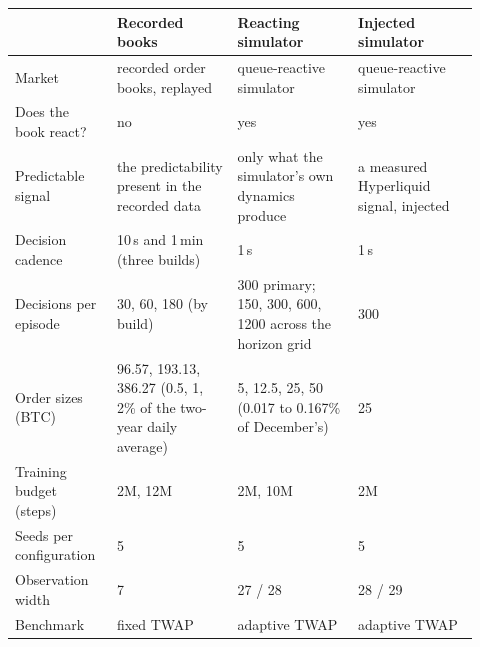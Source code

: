 \begin{tabular}{@{}>{\raggedright\arraybackslash}p{0.2\linewidth}p{0.24\linewidth}p{0.24\linewidth}p{0.24\linewidth}@{}}
\toprule
\textbf{} & \textbf{Recorded books} & \textbf{Reacting simulator} & \textbf{Injected simulator} \\
\midrule
Market & recorded order books, replayed & queue-reactive simulator & queue-reactive simulator \\
\addlinespace[4pt]
Does the book react? & no & yes & yes \\
\addlinespace[4pt]
Predictable signal & the predictability present in the recorded data & only what the simulator's own dynamics produce & a measured Hyperliquid signal, injected \\
\addlinespace[4pt]
Decision cadence & 10\,s and 1\,min (three builds) & 1\,s & 1\,s \\
\addlinespace[4pt]
Decisions per episode & 30, 60, 180 (by build) & 300 primary; {150, 300, 600, 1200} across the horizon grid & 300 \\
\addlinespace[4pt]
Order sizes (BTC) & 96.57, 193.13, 386.27 (0.5, 1, 2\% of the two-year daily average) & 5, 12.5, 25, 50 (0.017 to 0.167\% of December's) & 25 \\
\addlinespace[4pt]
Training budget (steps) & 2M, 12M & 2M, 10M & 2M \\
\addlinespace[4pt]
Seeds per configuration & 5 & 5 & 5 \\
\addlinespace[4pt]
Observation width & 7 & 27 / 28 & 28 / 29 \\
\addlinespace[4pt]
Benchmark & fixed TWAP & adaptive TWAP & adaptive TWAP \\
\bottomrule
\end{tabular}
